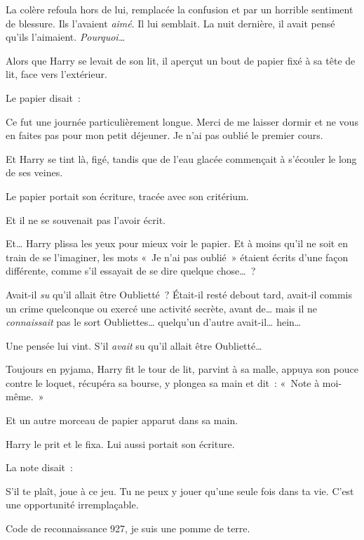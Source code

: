 La colère refoula hors de lui, remplacée la confusion et par un horrible sentiment de blessure.
Ils l'avaient \emph{aimé}. Il lui semblait.
La nuit dernière, il avait pensé qu'ils l'aimaient. \emph{Pourquoi…}

Alors que Harry se levait de son lit, il aperçut un bout de papier fixé à sa tête de lit, face vers l'extérieur.

Le papier disait~:

\begin{writtenNote}

Ce fut une journée particulièrement longue. Merci de me laisser dormir et ne vous en faites pas pour mon petit déjeuner. Je n'ai pas oublié le premier cours.

\end{writtenNote}

Et Harry se tint là, figé, tandis que de l'eau glacée commençait à s'écouler le long de ses veines.

Le papier portait son écriture, tracée avec son critérium.

Et il ne se souvenait pas l'avoir écrit.

Et… Harry plissa les yeux pour mieux voir le papier. Et à moins qu'il ne soit en train de se l'imaginer, les mots «~Je n'ai pas oublié~» étaient écrits d'une façon différente, comme s'il essayait de se dire quelque chose…~?

Avait-il \emph{su} qu'il allait être Oublietté~? Était-il resté debout tard, avait-il commis un crime quelconque ou exercé une activité secrète, avant de… mais il ne \emph{connaissait} pas le sort Oubliettes… quelqu'un d'autre avait-il… hein…

Une pensée lui vint. S'il \emph{avait} su qu'il allait être Oublietté…

Toujours en pyjama, Harry fit le tour de lit, parvint à sa malle, appuya son pouce contre le loquet, récupéra sa bourse, y plongea sa main et dit~: «~Note à moi-même.~»

Et un autre morceau de papier apparut dans sa main.

Harry le prit et le fixa. Lui aussi portait son écriture.

La note disait~:

\begin{writtenNote}

S'il te plaît, joue à ce jeu. Tu ne peux y jouer qu'une seule fois dans ta vie. C'est une opportunité irremplaçable.

Code de reconnaissance 927, je suis une pomme de terre.

\end{writtenNote}

